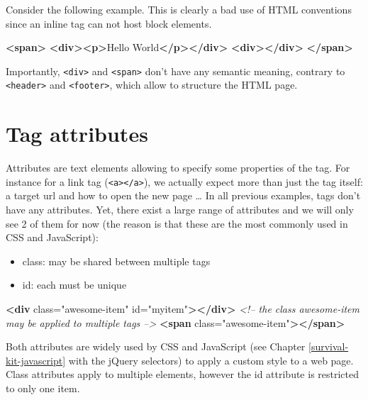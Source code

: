 \documentclass[]{book}
\newenvironment{Shaded}{\begin{snugshade}}{\end{snugshade}}
\newcommand{\CommentTok}[1]{\textcolor[rgb]{0.56,0.35,0.01}{\textit{#1}}}
\newcommand{\KeywordTok}[1]{\textcolor[rgb]{0.13,0.29,0.53}{\textbf{#1}}}
\newcommand{\NormalTok}[1]{#1}
\newcommand{\OtherTok}[1]{\textcolor[rgb]{0.56,0.35,0.01}{#1}}
\newcommand{\StringTok}[1]{\textcolor[rgb]{0.31,0.60,0.02}{#1}}
\providecommand{\tightlist}{%
  \setlength{\itemsep}{0pt}\setlength{\parskip}{0pt}}
\begin{document}
Consider the following example. This is clearly a bad use of HTML conventions since an inline tag can not host block elements.

\begin{Shaded}
\begin{Highlighting}[]
\KeywordTok{<span>}
  \KeywordTok{<div><p>}\NormalTok{Hello World}\KeywordTok{</p></div>}
  \KeywordTok{<div></div>}
\KeywordTok{</span>}
\end{Highlighting}
\end{Shaded}

Importantly, \texttt{\textless{}div\textgreater{}} and \texttt{\textless{}span\textgreater{}} don't have any semantic meaning, contrary to \texttt{\textless{}header\textgreater{}} and \texttt{\textless{}footer\textgreater{}}, which allow to structure the HTML page.

\hypertarget{tag-attributes}{%
\section{Tag attributes}\label{tag-attributes}}

Attributes are text elements allowing to specify some properties of the tag. For instance for a link tag (\texttt{\textless{}a\textgreater{}\textless{}/a\textgreater{}}), we actually expect more than just the tag itself: a target url and how to open the new page \ldots{} In all previous examples, tags don't have any attributes. Yet, there exist a large range of attributes and we will only see 2 of them for now (the reason is that these are the most commonly used in CSS and JavaScript):

\begin{itemize}
\tightlist
\item
  class: may be shared between multiple tags
\item
  id: each must be unique
\end{itemize}

\begin{Shaded}
\begin{Highlighting}[]
\KeywordTok{<div}\OtherTok{ class=}\StringTok{"awesome-item"}\OtherTok{ id=}\StringTok{"myitem"}\KeywordTok{></div>}
\CommentTok{<!-- the class awesome-item may be applied to multiple tags -->}
\KeywordTok{<span}\OtherTok{ class=}\StringTok{"awesome-item"}\KeywordTok{></span>}
\end{Highlighting}
\end{Shaded}

Both attributes are widely used by CSS and JavaScript (see Chapter \ref{survival-kit-javascript} with the jQuery selectors) to apply a custom style to a web page. Class attributes apply to multiple elements, however the id attribute is restricted to only one item.
\end{document}
